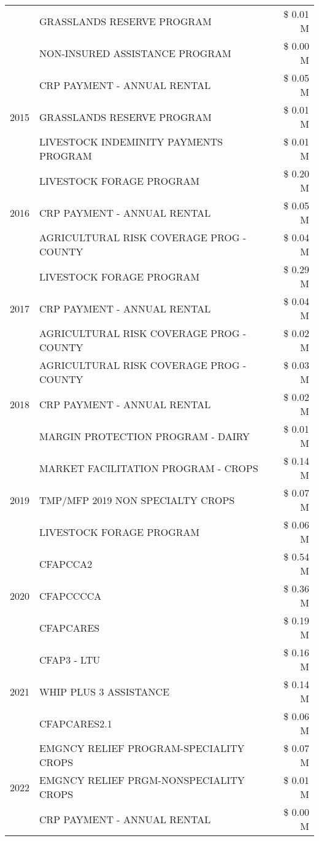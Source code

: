 \begin{tabular}{llr}
 & GRASSLANDS RESERVE PROGRAM & \$ 0.01 M \\
 & NON-INSURED ASSISTANCE PROGRAM & \$ 0.00 M \\
\cline{1-3}
\multirow[t]{3}{*}{2015} & CRP PAYMENT - ANNUAL RENTAL & \$ 0.05 M \\
 & GRASSLANDS RESERVE PROGRAM & \$ 0.01 M \\
 & LIVESTOCK INDEMINITY PAYMENTS PROGRAM & \$ 0.01 M \\
\cline{1-3}
\multirow[t]{3}{*}{2016} & LIVESTOCK FORAGE PROGRAM & \$ 0.20 M \\
 & CRP PAYMENT - ANNUAL RENTAL & \$ 0.05 M \\
 & AGRICULTURAL RISK COVERAGE PROG - COUNTY & \$ 0.04 M \\
\cline{1-3}
\multirow[t]{3}{*}{2017} & LIVESTOCK FORAGE PROGRAM & \$ 0.29 M \\
 & CRP PAYMENT - ANNUAL RENTAL & \$ 0.04 M \\
 & AGRICULTURAL RISK COVERAGE PROG - COUNTY & \$ 0.02 M \\
\cline{1-3}
\multirow[t]{3}{*}{2018} & AGRICULTURAL RISK COVERAGE PROG - COUNTY & \$ 0.03 M \\
 & CRP PAYMENT - ANNUAL RENTAL & \$ 0.02 M \\
 & MARGIN PROTECTION PROGRAM - DAIRY & \$ 0.01 M \\
\cline{1-3}
\multirow[t]{3}{*}{2019} & MARKET FACILITATION PROGRAM - CROPS & \$ 0.14 M \\
 & TMP/MFP 2019 NON SPECIALTY CROPS & \$ 0.07 M \\
 & LIVESTOCK FORAGE PROGRAM & \$ 0.06 M \\
\cline{1-3}
\multirow[t]{3}{*}{2020} & CFAPCCA2 & \$ 0.54 M \\
 & CFAPCCCCA & \$ 0.36 M \\
 & CFAPCARES & \$ 0.19 M \\
\cline{1-3}
\multirow[t]{3}{*}{2021} & CFAP3 - LTU & \$ 0.16 M \\
 & WHIP PLUS 3 ASSISTANCE & \$ 0.14 M \\
 & CFAPCARES2.1 & \$ 0.06 M \\
\cline{1-3}
\multirow[t]{3}{*}{2022} & EMGNCY RELIEF PROGRAM-SPECIALITY CROPS & \$ 0.07 M \\
 & EMGNCY RELIEF PRGM-NONSPECIALITY CROPS & \$ 0.01 M \\
 & CRP PAYMENT - ANNUAL RENTAL & \$ 0.00 M \\
\cline{1-3}
\bottomrule
\end{tabular}
